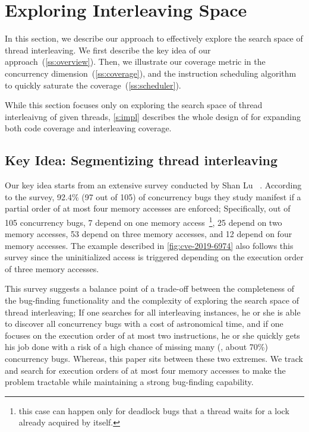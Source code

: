 \section{Exploring Interleaving Space}
\label{s:design}


In this section, we describe our approach to effectively explore the
search space of thread interleaving.
%
We first describe the key idea of our
approach~(\autoref{ss:overview}). Then, we illustrate our coverage
metric in the concurrency dimension~(\autoref{ss:coverage}), and the
instruction scheduling algorithm to quickly saturate the
coverage~(\autoref{ss:scheduler}).



While this section focuses only on exploring the search space of
thread interleaivng of given threads, \autoref{s:impl} describes the
whole design of \sys for expanding both code coverage and interleaving
coverage.


\subsection{Key Idea: Segmentizing thread interleaving}
\label{ss:overview}


Our key idea starts from an extensive survey conducted by Shan Lu
\etal~\cite{learningfrommistakes}.
%
According to the survey, 92.4\% (97 out of 105) of concurrency bugs
they study manifest if a partial order of at most four memory accesses
are enforced;
%
Specifically, out of 105 concurrency bugs, 7 depend on one memory
access~\footnote{this case can happen only for deadlock bugs that a
  thread waits for a lock already acquired by itself.}, 25 depend on
two memory accesses, 53 depend on three memory accesses, and 12 depend
on four memory accesses.
%
The example described in \autoref{fig:cve-2019-6974} also follows this
survey since the uninitialized access is triggered depending on the
execution order of three memory accesses.


This survey suggests a balance point of a trade-off between the
completeness of the bug-finding functionality and the complexity of
exploring the search space of thread interleaving;
%
If one searches for all interleaving instances, he or she is able to
discover all concurrency bugs with a cost of astronomical time, and
if one focuses on the execution order of at most two instructions, he
or she quickly gets his job done with a risk of a high chance of
missing many (\eg, about 70\%) concurrency bugs.
%
Whereas, this paper sits between these two extremes. We track and
search for execution orders of at most four memory accesses to make
the problem tractable while maintaining a strong bug-finding
capability.




